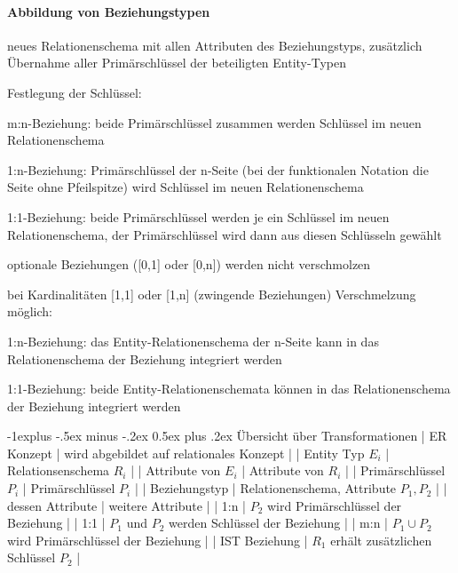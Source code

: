 \documentclass[a4paper]{article}
\makeatletter
\renewcommand{\subsection}{\@startsection{subsection}{2}{0mm}%
                                {-1explus -.5ex minus -.2ex}%
                                {0.5ex plus .2ex}%
                                {\normalfont\normalsize\bfseries}}
\makeatother
\begin{document}
\begin{multicols}{3}
\paragraph{Abbildung von Beziehungstypen}
\begin{itemize*}
    \item neues Relationenschema mit allen Attributen des Beziehungstyps, zusätzlich Übernahme aller Primärschlüssel der beteiligten Entity-Typen
    \item Festlegung der Schlüssel:
    \begin{itemize*}
        \item m:n-Beziehung: beide Primärschlüssel zusammen werden Schlüssel im neuen Relationenschema
        \item 1:n-Beziehung: Primärschlüssel der n-Seite (bei der funktionalen Notation die Seite ohne Pfeilspitze) wird Schlüssel im neuen Relationenschema
        \item 1:1-Beziehung: beide Primärschlüssel werden je ein Schlüssel im neuen Relationenschema, der Primärschlüssel wird dann aus diesen Schlüsseln gewählt
    \end{itemize*}
    \item optionale Beziehungen ([0,1] oder [0,n]) werden nicht verschmolzen
    \item bei Kardinalitäten [1,1] oder [1,n] (zwingende Beziehungen) Verschmelzung möglich:
    \begin{itemize*}
        \item 1:n-Beziehung: das Entity-Relationenschema der n-Seite kann in das Relationenschema der Beziehung integriert werden
        \item 1:1-Beziehung: beide Entity-Relationenschemata können in das Relationenschema der Beziehung integriert werden
    \end{itemize*}
\end{itemize*}

\subsection{Übersicht über Transformationen}
| ER Konzept | wird abgebildet auf relationales Konzept |
| Entity Typ $E_i$      | Relationsenschema $R_i$ |
| Attribute von $E_i$   | Attribute von $R_i$     |
| Primärschlüssel $P_i$ | Primärschlüssel $P_i$   |
| Beziehungstyp         | Relationenschema, Attribute $P_1,P_2$ |
| dessen Attribute      | weitere Attribute       |
| 1:n                   | $P_2$ wird Primärschlüssel der Beziehung |
| 1:1                   | $P_1$ und $P_2$ werden Schlüssel der Beziehung |
| m:n                   | $P_1 \cup P_2$ wird Primärschlüssel der Beziehung |
| IST Beziehung         | $R_1$ erhält zusätzlichen Schlüssel $P_2$ |


\end{multicols}
\end{document}
